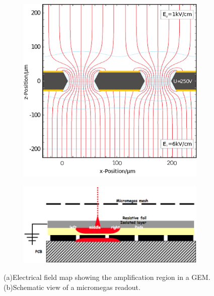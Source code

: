 \begin{figure}[t!]
\begin{subfigure}{0.49 \textwidth}
\includegraphics[width=1\hsize,viewport={0 -10 600 500},clip]{Detector/fig/GEM.png} 
\caption{}
\end{subfigure}
\begin{subfigure}{0.49\textwidth}
\includegraphics[width=1.0\hsize]{Detector/fig/micromegas.png}
\caption{}
\end{subfigure}
\caption[TPC readout]{(a)Electrical field map showing the amplification region in a GEM. (b)Schematic view of a micromegas readout.}
\label{fig:det:TPC_readout}
\end{figure}

